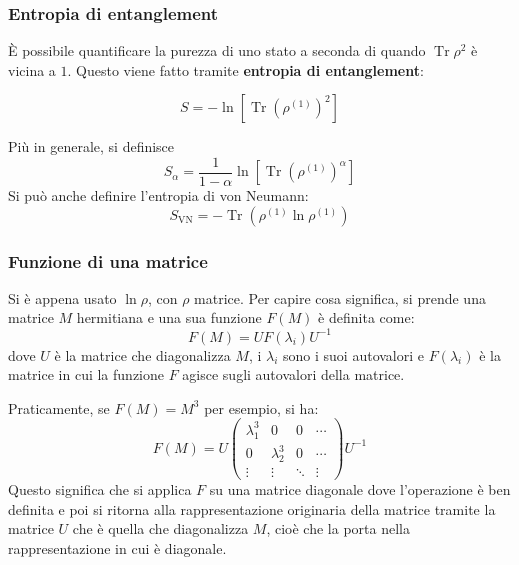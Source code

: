 \documentclass[11pt, a4paper]{scrartcl} %
\numberwithin{equation}{subsection}
\theoremstyle{style2}
\theoremstyle{style1}
\newenvironment{boxenv}[1][]{
    \begin{eqbox}[#1]
    }{
   \end{eqbox}
}
\begin{document}
\subsubsection{Entropia di entanglement}

\`E possibile quantificare la purezza di uno stato a seconda di quando $\operatorname{Tr} \rho ^2$ \`e vicina a $1$. 
Questo viene fatto tramite \textbf{entropia di entanglement}:
\begin{boxenv}[]
\begin{equation}
	S = - \ln \left[ \operatorname{Tr} \left(\rho ^{(1)} \right) ^2 \right] 
\end{equation}
\end{boxenv}
Pi\`u in generale, si definisce 
\begin{equation}
	S_\alpha = \frac{1}{1-\alpha } \ln \left[ \operatorname{Tr} \left(\rho^{(1)}  \right) ^\alpha  \right] 
\end{equation}
Si pu\`o anche definire l'entropia di von Neumann:
\begin{equation}
	S_\text{VN} = - \operatorname{Tr} \left(\rho ^{(1)} \ln\rho ^{(1)} \right) 
\end{equation}
\subsubsection{Funzione di una matrice}
Si \`e appena usato $\ln \rho $, con $\rho $ matrice. 
Per capire cosa significa, si prende una matrice $M$ hermitiana e una sua funzione $F(M)$ \`e definita come:
\begin{equation}
	F(M) = U F(\lambda _i) U^{-1} 
\end{equation}
dove $U$ \`e la matrice che diagonalizza $M$, i $\lambda _i$ sono i suoi autovalori e $F(\lambda _i)$ \`e la matrice in cui la funzione $F$ agisce sugli autovalori della matrice.

Praticamente, se $F(M) = M ^3$ per esempio, si ha:
\[
	F(M) = U \begin{pmatrix} \lambda _1^3 & 0 &0 & \cdots \\ 0& \lambda _2 ^3 & 0 &\cdots \\ \vdots & \vdots & \ddots & \vdots\end{pmatrix} U^{-1} 
\] 
Questo significa che si applica $F$ su una matrice diagonale dove l'operazione \`e ben definita e poi si ritorna alla rappresentazione originaria della matrice tramite la matrice $U$ che \`e quella che diagonalizza $M$, cio\`e che la porta nella rappresentazione in cui \`e diagonale.
\end{document}
